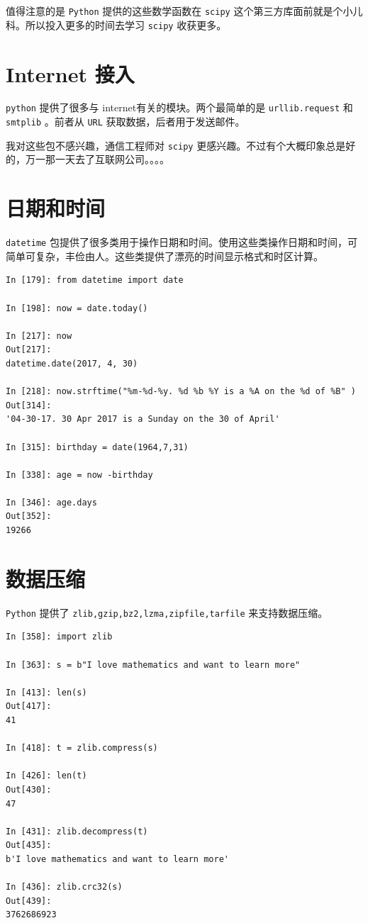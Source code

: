 \documentclass[10pt,a4paper,UTF8]{article}
\begin{document}
值得注意的是 \texttt{Python} 提供的这些数学函数在 \texttt{scipy} 这个第三方库面前就是个小儿科。所以投入更多的时间去学习 \texttt{scipy} 收获更多。

\section{Internet 接入}
\label{sec:org8732358}


\texttt{python} 提供了很多与 internet有关的模块。两个最简单的是 \texttt{urllib.request} 和 \texttt{smtplib} 。前者从 \texttt{URL} 获取数据，后者用于发送邮件。

我对这些包不感兴趣，通信工程师对 \texttt{scipy} 更感兴趣。不过有个大概印象总是好的，万一那一天去了互联网公司。。。。

\section{日期和时间}
\label{sec:org616aa7b}


\texttt{datetime} 包提供了很多类用于操作日期和时间。使用这些类操作日期和时间，可简单可复杂，丰俭由人。这些类提供了漂亮的时间显示格式和时区计算。

\begin{verbatim}
In [179]: from datetime import date

In [198]: now = date.today()

In [217]: now
Out[217]:
datetime.date(2017, 4, 30)

In [218]: now.strftime("%m-%d-%y. %d %b %Y is a %A on the %d of %B" )
Out[314]:
'04-30-17. 30 Apr 2017 is a Sunday on the 30 of April'

In [315]: birthday = date(1964,7,31)

In [338]: age = now -birthday

In [346]: age.days
Out[352]:
19266
\end{verbatim}
\section{数据压缩}
\label{sec:org23ea1c1}


\texttt{Python} 提供了  \texttt{zlib,gzip,bz2,lzma,zipfile,tarfile} 来支持数据压缩。

\begin{verbatim}
In [358]: import zlib

In [363]: s = b"I love mathematics and want to learn more"

In [413]: len(s)
Out[417]:
41

In [418]: t = zlib.compress(s)

In [426]: len(t)
Out[430]:
47

In [431]: zlib.decompress(t)
Out[435]:
b'I love mathematics and want to learn more'

In [436]: zlib.crc32(s)
Out[439]:
3762686923
\end{verbatim}
\end{document}
